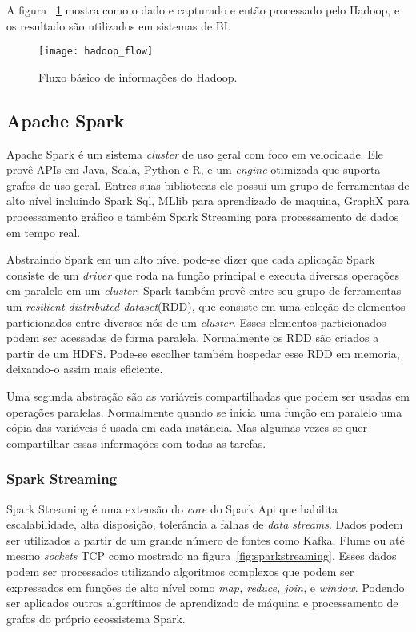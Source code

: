 A figura ~\ref{fig:hadoopflow} mostra como o dado e capturado e então processado pelo Hadoop, e os resultado são utilizados em sistemas de BI.~\cite{hadoopessentials}

\begin{figure}[!h]
	\caption{\label{fig:hadoopflow} Fluxo básico de informações do Hadoop.}
	\begin{center}
		\texttt{[image: hadoop\_flow]}
	\end{center}
\end{figure}


\subsection{Apache Spark}
Apache Spark é um sistema \textit{cluster} de uso geral com foco em velocidade. Ele provê APIs em Java, Scala, Python e R, e um \textit{engine} otimizada que suporta grafos de uso geral. Entres suas bibliotecas ele possui um grupo de ferramentas de alto nível incluindo Spark Sql, MLlib para aprendizado de maquina, GraphX para processamento gráfico e também Spark Streaming para processamento de dados em tempo real.

Abstraindo Spark em um alto nível pode-se dizer que cada aplicação Spark consiste de um \textit{driver} que roda na função principal e executa diversas operações em paralelo em um \textit{cluster}. Spark também provê entre seu grupo de  ferramentas um \textit{resilient distributed dataset}(RDD), que consiste em uma coleção de elementos particionados entre diversos nós de um \textit{cluster}. Esses elementos particionados podem ser acessadas de forma paralela. Normalmente os RDD são criados a partir de um HDFS. Pode-se escolher também hospedar esse RDD em memoria, deixando-o assim mais eficiente.

Uma segunda abstração são as variáveis compartilhadas que podem ser usadas em operações paralelas. Normalmente quando se inicia uma função em paralelo uma cópia das variáveis é usada em cada instância. Mas algumas vezes se quer compartilhar essas informações com todas as tarefas.

\subsubsection{Spark Streaming}
Spark Streaming é uma extensão do \textit{core} do Spark Api que habilita escalabilidade, alta disposição, tolerância a falhas de \textit{data streams}. Dados podem ser utilizados a partir de um grande número de fontes como Kafka, Flume ou até mesmo \textit{sockets} TCP como mostrado na figura~\ref{fig:sparkstreaming}. Esses dados podem ser processados utilizando algoritmos complexos que podem ser expressados em funções de alto nível como \textit{map, reduce, join,} e \textit{window}. Podendo ser aplicados outros algorítimos de aprendizado de máquina e processamento de grafos do próprio ecossistema Spark.~\cite{sparkstreaming}

